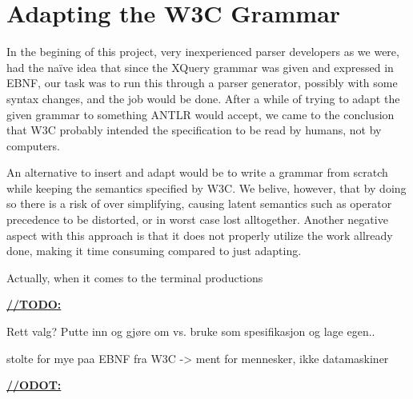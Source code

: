 \section{Adapting the W3C Grammar}
\label{sect:discussion:adaptW3C}

In the begining of this project, very inexperienced parser developers as we were, had the na\"{i}ve idea that since the XQuery grammar was given and expressed in EBNF, our task was to run this through a parser generator, possibly with some syntax changes, and the job would be done. After a while of trying to adapt the given grammar to something ANTLR would accept, we came to the conclusion that W3C probably intended the specification to be read by humans, not by computers.

An alternative to insert and adapt would be to write a grammar from scratch while keeping the semantics specified by W3C. We belive, however, that by doing so there is a risk of over simplifying, causing latent semantics such as operator precedence to be distorted, or in worst case lost alltogether. Another negative aspect with this approach is that it does not properly utilize the work allready done, making it time consuming compared to just adapting.

Actually, when it comes to the terminal productions

\underline{\textbf{\LARGE //TODO:}}

Rett valg? Putte inn og gj\o re om vs. bruke som spesifikasjon og lage egen..

stolte for mye paa EBNF fra W3C -> ment for mennesker, ikke datamaskiner

\underline{\textbf{\LARGE //ODOT:}}